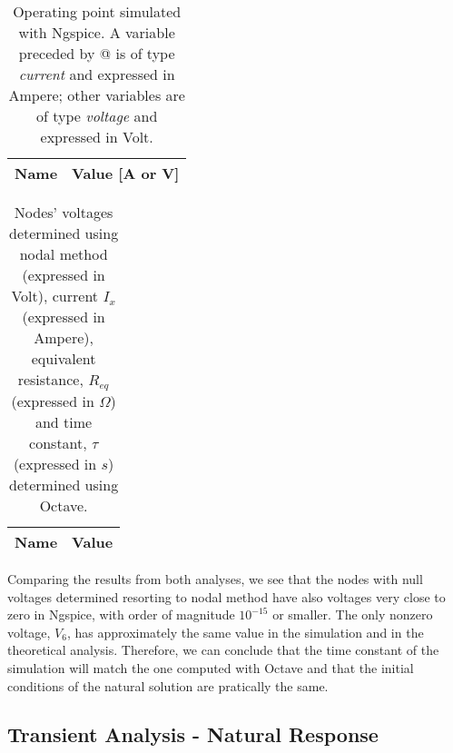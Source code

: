 \vspace{1mm}

\noindent
\begin{minipage}[c]{0.5\linewidth}

\begin{table}[H]
  \centering
  \begin{tabular}{|l|r|}
    \hline    
    {\bf Name} & {\bf Value [A or V]} \\ \hline
    
  \end{tabular}
  \caption{Operating point simulated with Ngspice. A variable preceded by @ is of type {\em current} and expressed in Ampere; other variables are of type {\it voltage} and expressed in Volt.}
  \label{tab:op21}
\end{table}

\end{minipage}
\begin{minipage}[c]{0.5\linewidth}

\vspace{24mm}

\begin{table}[H]
  \centering
  \begin{tabular}{|l|r|}
    \hline    
    {\bf Name} & {\bf Value} \\ \hline
    
  \end{tabular}
  \caption{Nodes' voltages determined using nodal method (expressed in Volt), current $I_x$ (expressed in Ampere), equivalent resistance, $R_{eq}$ (expressed in $\Omega$) and time constant, $\tau$ (expressed in $s$) determined using Octave.}
  \label{tab:op22}
\end{table}

\end{minipage}

\vspace{3mm}

Comparing the results from both analyses, we see that the nodes with null voltages determined resorting to nodal method have also voltages very close to zero in Ngspice, with order of magnitude $10^{-15}$ or smaller. The only nonzero voltage, $V_6$, has approximately the same value in the simulation and in the theoretical analysis. Therefore, we can conclude that the time constant of the simulation will match the one computed with Octave and that the initial conditions of the natural solution are pratically the same.

\subsection{Transient Analysis - Natural Response} \label{subsec:trannat}

